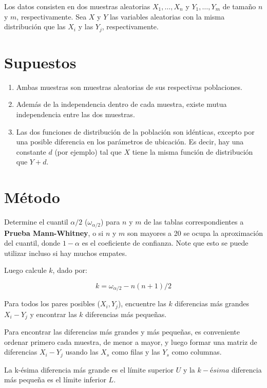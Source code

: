 \documentclass[
  a4paper,
  oneside,
  openany]{book}
\begin{document}
Los datos consisten en dos muestras aleatorias \(X_{1}, \ldots, X_{n}\) y \(Y_{1}, \ldots, Y_{m}\) de tamaño \(n\) y \(m\), respectivamente. Sea \(X\) y \(Y\) las variables aleatorias con la misma distribución que las \(X_{i}\) y las \(Y_{j}\), respectivamente.

\hypertarget{supuestos-6}{%
\section{Supuestos}\label{supuestos-6}}

\begin{enumerate}
\def\labelenumi{\arabic{enumi})}
\item
  Ambas muestras son muestras aleatorias de sus respectivas poblaciones.
\item
  Además de la independencia dentro de cada muestra, existe mutua independencia entre las dos muestras.
\item
  Las dos funciones de distribución de la población son idénticas, excepto por una posible diferencia en los parámetros de ubicación. Es decir, hay una constante \(d\) (por ejemplo) tal que \(X\) tiene la misma función de distribución que \(Y + d\).
\end{enumerate}

\hypertarget{muxe9todo}{%
\section{Método}\label{muxe9todo}}

Determine el cuantil \(\alpha/2\) (\(\omega_{\alpha/2}\)) para \(n\) y \(m\) de las tablas correspondientes a \textbf{Prueba Mann-Whitney}, o si \(n\) y \(m\) son mayores a 20 se ocupa la aproximación del cuantil, donde \(1-\alpha\) es el coeficiente de confianza. Note que esto se puede utilizar incluso si hay muchos empates.

Luego calcule \(k\), dado por:

\[k= \omega_{\alpha/2}-n(n+1)/2\]

Para todos los pares posibles (\(X_{i},Y_{j}\)), encuentre las \(k\) diferencias más grandes \(X_{i}-Y_{j}\) y encontrar las \(k\) diferencias más pequeñas.

Para encontrar las diferencias más grandes y más pequeñas, es conveniente ordenar primero cada muestra, de menor a mayor, y luego formar una matriz de diferencias \(X_{i}-Y_{j}\) usando las \(X_s\) como filas y las \(Y_s\) como columnas.

La k-ésima diferencia más grande es el límite superior \(U\) y la \(k-ésima\) diferencia más pequeña es el límite inferior \(L\).
\end{document}
